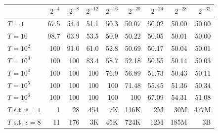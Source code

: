 \begin{tabular}{lrrrrrrrr}
\toprule
 & $2^{-4}$ & $2^{-8}$ & $2^{-12}$ & $2^{-16}$ & $2^{-20}$ & $2^{-24}$ & $2^{-28}$ & $2^{-32}$ \\
\midrule
$T=1$ & 67.5 & 54.4 & 51.1 & 50.3 & 50.07 & 50.02 & 50.00 & 50.00 \\
$T=10$ & 98.7 & 63.9 & 53.5 & 50.9 & 50.22 & 50.05 & 50.01 & 50.00 \\
$T=10^{2}$ & 100 & 91.0 & 61.0 & 52.8 & 50.69 & 50.17 & 50.04 & 50.01 \\
$T=10^{3}$ & 100 & 100 & 83.4 & 58.7 & 52.18 & 50.55 & 50.14 & 50.03 \\
$T=10^{4}$ & 100 & 100 & 100 & 76.9 & 56.89 & 51.73 & 50.43 & 50.11 \\
$T=10^{5}$ & 100 & 100 & 100 & 100 & 71.48 & 55.45 & 51.36 & 50.34 \\
$T=10^{6}$ & 100 & 100 & 100 & 100 & 100 & 67.09 & 54.31 & 51.08 \\
\midrule
$T$ s.t. $\epsilon=1$ & 1 & 28 & 454 & 7K & 116K & 2M & 30M & 477M \\
$T$ s.t. $\epsilon=8$ & 11 & 176 & 3K & 45K & 724K & 12M & 185M & 3B \\
\bottomrule
\end{tabular}
